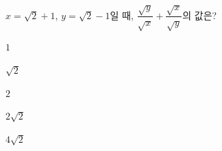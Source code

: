 \hspace*{2mm}\begin{minipage}[t]{\dimexpr\linewidth-2mm\relax}\vspace{0pt}
$x=\sqrt{2}+1$, $y=\sqrt{2}-1$일 때, $\dfrac{\sqrt{y}}{\sqrt{x}}+\dfrac{\sqrt{x}}{\sqrt{y}}$의 값은?
\begin{choices32}{\rule[-3ex]{0pt}{8ex}$1$}{\rule[-3ex]{0pt}{8ex}$\sqrt{2}$}{\rule[-3ex]{0pt}{8ex}$2$}{\rule[-3ex]{0pt}{8ex}$2\sqrt{2}$}{\rule[-3ex]{0pt}{8ex}$4\sqrt{2}$}\end{choices32}\end{minipage}
